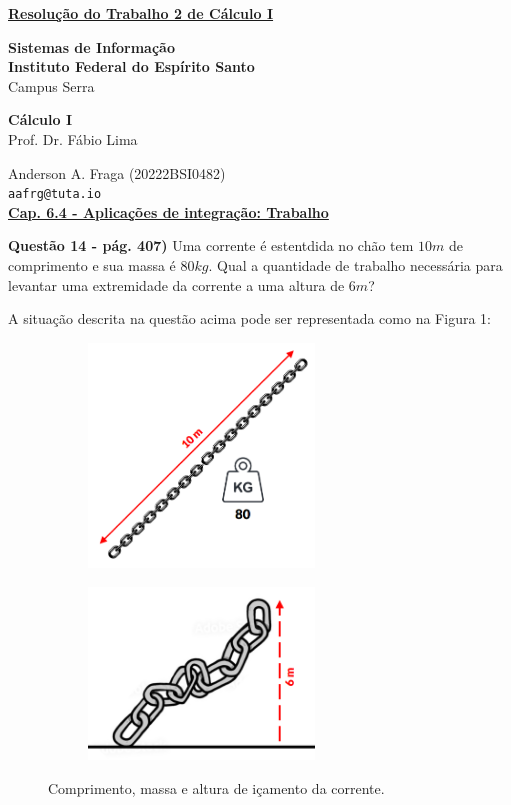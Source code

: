 \documentclass[12pt]{article}
\begin{document}
\underline{\textbf{Resolução do Trabalho 2 de Cálculo I}}\par
\textbf{Sistemas de Informação}\\
\textbf{Instituto Federal do Espírito Santo}\\
Campus Serra\par
\textbf{Cálculo I}\\
Prof. Dr. Fábio Lima\par
Anderson A. Fraga (20222BSI0482)\\
\texttt{aafrg@tuta.io}\\  %

\noindent \underline{\textbf{Cap. 6.4 - Aplicações de integração: Trabalho}}\par
\noindent \textbf{Questão 14 - pág. 407)} Uma corrente é estentdida no chão tem $10 m$ de comprimento e sua massa é $80 kg$. Qual a quantidade de trabalho necessária para levantar uma extremidade da corrente a uma altura de $6 m$?\par
A situação descrita na questão acima pode ser representada como na Figura 1:\par
\begin{figure}[h]
    \centering
    \begin{subfigure}{0.49\textwidth}
        \includegraphics[width=6cm]{fig/fig1.PNG}
    \end{subfigure}
    \begin{subfigure}{0.49\textwidth}
        \includegraphics[width=6cm]{fig/fig2.PNG}
    \end{subfigure}
    \caption{\small Comprimento, massa e altura de içamento da corrente.}
\end{figure}\par
\end{document}
